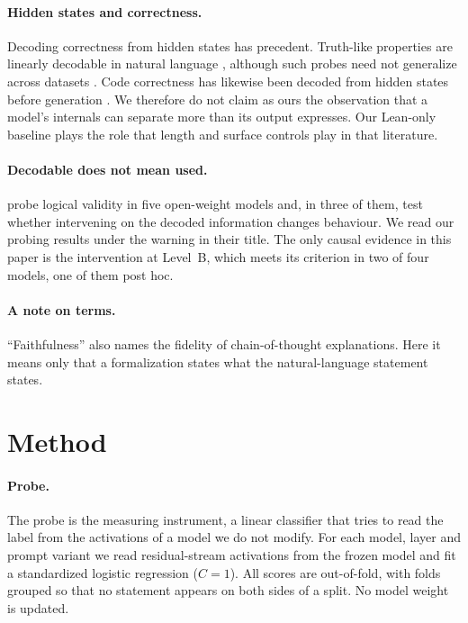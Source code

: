 \documentclass[10pt]{article}
\begin{document}
\paragraph{Hidden states and correctness.}
Decoding correctness from hidden states has precedent. Truth-like properties are linearly decodable in natural
language \citep{geometry}, although such probes need not generalize across datasets \citep{orgad}. Code correctness
has likewise been decoded from hidden states before generation \citep{dicicco}. We therefore do not claim as ours
the observation that a model's internals can separate more than its output expresses. Our Lean-only baseline plays
the role that length and surface controls play in that literature.

\paragraph{Decodable does not mean used.}
\citet{decodability} probe logical validity in five open-weight models and, in three of them, test
whether intervening on the decoded information changes behaviour. We read our probing results under the warning in their title. The only causal evidence in this paper is the
intervention at Level~B, which meets its criterion in two of four models, one of them post hoc.

\paragraph{A note on terms.}
``Faithfulness'' also names the fidelity of chain-of-thought explanations. Here it means only that a formalization
states what the natural-language statement states.

\section{Method}

\paragraph{Probe.}
The probe is the measuring instrument, a linear classifier that tries to read the label from the activations of a
model we do not modify.
For each model, layer and prompt variant we read residual-stream activations from the frozen model and fit a
standardized logistic regression ($C = 1$). All scores are out-of-fold, with folds grouped so that no statement
appears on both sides of a split. No model weight is updated.
\end{document}
